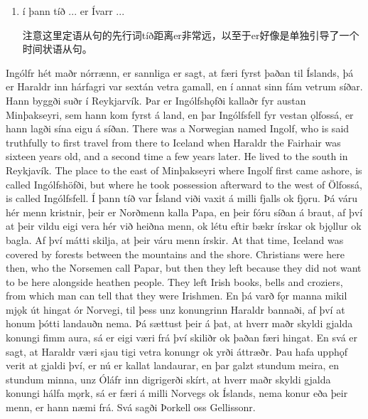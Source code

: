\begin{grammar*}{}
    \begin{enumerate}
        \item í þann tíð ... er Ívarr ...

              注意这里定语从句的先行词tíð距离er非常远，以至于er好像是单独引导了一个时间状语从句。
    \end{enumerate}
\end{grammar*}
\begin{paracol}{2}

    Ingólfr hét maðr nórrænn, er sannliga er sagt, at færi fyrst þaðan til Íslands, þá er Haraldr inn hárfagri var sextán vetra gamall, en í annat sinn fám vetrum síðar. Hann byggði suðr í Reykjarvík. Þar er Ingólfshǫfði kallaðr fyr austan Minþakseyri, sem hann kom fyrst á land, en þar Ingólfsfell fyr vestan ǫlfossá, er hann lagði sína eigu á síðan.
    \switchcolumn
    There was a Norwegian named Ingolf, who is said truthfully to first travel from there to Iceland when Haraldr the Fairhair was sixteen years old, and a second time a few years later. He lived to the south in Reykjavík. The place to the east of Minþakseyri where Ingolf first came ashore, is called Ingólfshöfði, but where he took possession afterward to the west of Ölfossá, is called Ingólfsfell.
    \switchcolumn*
    Í þann tíð var Ísland viði vaxit á milli fjalls ok fjǫru. Þá váru hér menn kristnir, þeir er Norðmenn kalla Papa, en þeir fóru síðan á braut, af því at þeir vildu eigi vera hér við heiðna menn, ok létu eftir bækr írskar ok bjǫllur ok bagla. Af því mátti skilja, at þeir váru menn írskir.
    \switchcolumn
    At that time, Iceland was covered by forests between the mountains and the shore. Christians were here then, who the Norsemen call Papar, but then they left because they did not want to be here alongside heathen people. They left Irish books, bells and croziers, from which man can tell that they were Irishmen.
    \switchcolumn*
    En þá varð fǫr manna mikil mjǫk út hingat ór Norvegi, til þess unz konungrinn Haraldr bannaði, af því at honum þótti landauðn nema. Þá sættust þeir á þat, at hverr maðr skyldi gjalda konungi fimm aura, sá er eigi væri frá því skiliðr ok þaðan færi hingat. En svá er sagt, at Haraldr væri sjau tigi vetra konungr ok yrði áttræðr. Þau hafa upphǫf verit at gjaldi því, er nú er kallat landaurar, en þar galzt stundum meira, en stundum minna, unz Óláfr inn digri\footnotemark gerði skírt, at hverr maðr skyldi gjalda konungi hálfa mǫrk, sá er færi á milli Norvegs ok Íslands, nema konur eða þeir menn, er hann næmi frá. Svá sagði Þorkell oss Gellissonr.

\end{paracol}

